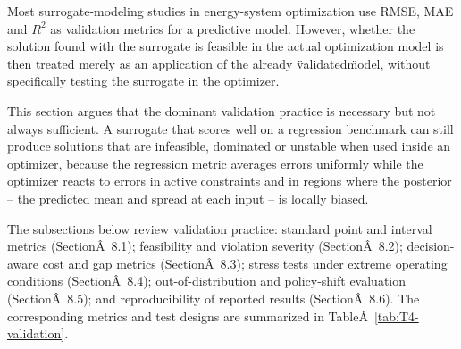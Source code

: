 \documentclass[final,5p,times,twocolumn]{elsarticle}
\begin{document}
Most surrogate-modeling studies in energy-system optimization use RMSE,
MAE and $R^{2}$ as validation metrics for a predictive model. However,
whether the solution found with the surrogate is feasible in the actual
optimization model is then treated merely as an application of the
already \"validated\" model, without specifically testing the surrogate
in the optimizer.

This section argues that the dominant validation practice is necessary
but not always sufficient. A surrogate that scores well on a regression
benchmark can still produce solutions that are infeasible, dominated or
unstable when used inside an optimizer, because the regression metric
averages errors uniformly while the optimizer reacts to errors in active
constraints and in regions where the posterior -- the predicted mean and
spread at each input -- is locally biased.

The subsections below review validation practice: standard point and
interval metrics (SectionÂ~8.1); feasibility and violation severity
(SectionÂ~8.2); decision-aware cost and gap metrics
(SectionÂ~8.3); stress tests under extreme operating
conditions (SectionÂ~8.4); out-of-distribution and policy-shift
evaluation (SectionÂ~8.5); and reproducibility of reported results
(SectionÂ~8.6). The corresponding metrics and test designs
are summarized in
TableÂ~\ref{tab:T4-validation}.
\end{document}
